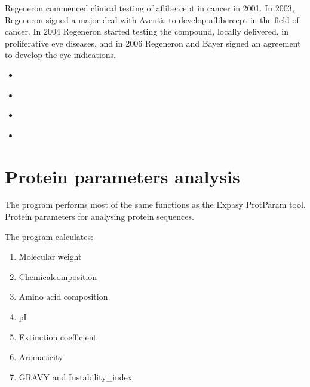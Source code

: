 \documentclass[letterpaper,10pt,english]{jupyterBook}
\begin{document}
\sphinxAtStartPar
Regeneron commenced clinical testing of aflibercept in cancer in 2001. In 2003, Regeneron signed a major deal with Aventis to develop aflibercept in the field of cancer. In 2004 Regeneron started testing the compound, locally delivered, in proliferative eye diseases, and in 2006 Regeneron and Bayer signed an agreement to develop the eye indications.

\begin{DUlineblock}{0em}
\item[] 
\end{DUlineblock}
\begin{itemize}
\item {} 
\sphinxAtStartPar
{\hyperref[\detokenize{ipynb/chapter1::doc}]{}}

\item {} 
\sphinxAtStartPar
{\hyperref[\detokenize{ipynb/chapter2::doc}]{}}

\item {} 
\sphinxAtStartPar
{\hyperref[\detokenize{ipynb/chapter3::doc}]{}}

\item {} 
\sphinxAtStartPar
{\hyperref[\detokenize{ipynb/chapter4::doc}]{}}

\end{itemize}

\sphinxstepscope


\chapter{Protein parameters analysis}
\label{\detokenize{ipynb/chapter1:protein-parameters-analysis}}\label{\detokenize{ipynb/chapter1::doc}}
\sphinxAtStartPar
The program performs most of the same functions as the Expasy ProtParam tool.
Protein parameters for analysing protein sequences.

\sphinxAtStartPar
The program calculates:
\begin{enumerate}
%
\item {} 
\sphinxAtStartPar
Molecular weight

\item {} 
\sphinxAtStartPar
Chemicalcomposition

\item {} 
\sphinxAtStartPar
Amino acid composition

\item {} 
\sphinxAtStartPar
pI

\item {} 
\sphinxAtStartPar
Extinction coefficient

\item {} 
\sphinxAtStartPar
Aromaticity

\item {} 
\sphinxAtStartPar
GRAVY and Instability\_index

\end{enumerate}
\end{document}
